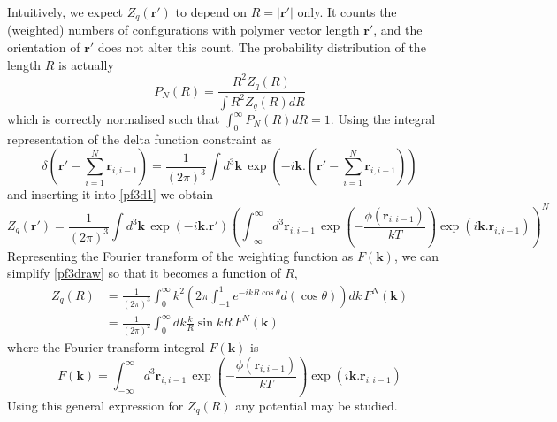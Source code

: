 Intuitively, we expect $Z_{q}\left(\boldsymbol{r}'\right)$ to depend on $R=|\boldsymbol{r}'|$ only. It counts the (weighted) numbers of configurations with polymer vector length $\boldsymbol{r}'$, and the orientation of $\boldsymbol{r}'$ does not alter this count. The probability distribution of the length $R$ is actually
%
\begin{equation}
P_{N}\left(R\right)= \frac{R^{2}Z_{q}\left(R\right)}{\int R^{2}Z_{q}\left(R\right)dR}
\end{equation}
%
which is correctly normalised such that $\int^{\infty}_{0} P_{N}\left(R\right)dR=1$. Using the integral representation of the delta function constraint as
%
\begin{equation}\label{pf3d_delta}
\delta\left(\boldsymbol{r}'-\sum_{i=1}^{N}\boldsymbol{r}_{i,i-1}\right)=\frac{1}{\left(2\pi\right)^{3}}\int d^{3}\boldsymbol{k}\, \exp\left(-i\boldsymbol{k}.\left(\boldsymbol{r}'-\sum_{i=1}^{N}\boldsymbol{r}_{i,i-1}\right)\right)
\end{equation}
%
and inserting it into \eqref{pf3d1} we obtain
%
\begin{equation}\label{pf3draw}
Z_{q}\left(\boldsymbol{r}'\right) = \frac{1}{\left(2\pi\right)^{3}}\int d^{3}\boldsymbol{k}\, \exp\left(-i\boldsymbol{k}.\boldsymbol{r}'\right)\left(\int_{-\infty}^{\infty}d^{3}\boldsymbol{r}_{i,i-1}\, \exp\left(-\frac{\phi\left(\boldsymbol{r}_{i,i-1}\right)}{kT}\right)\exp\left(i\boldsymbol{k}.\boldsymbol{r}_{i,i-1}\right) \right)^{N}
\end{equation}
%
Representing the Fourier transform of the weighting function as $F\left(\boldsymbol{k}\right)$, we can simplify \eqref{pf3draw} so that it becomes a function of $R$,
%
\begin{align}
Z_{q}\left(R\right) &= \frac{1}{\left(2\pi\right)^{3}}\int_{0}^{\infty}k^{2}\left(2\pi\int_{-1}^{1} e^{-ikR\cos \theta} d\left(\cos \theta \right)\right)dk\, F^{N}\left(\boldsymbol{k}\right) \\
&= \frac{1}{\left(2\pi\right)^{2}}\int_{0}^{\infty}dk\frac{k}{R}\sin kR\, F^{N}\left(\boldsymbol{k}\right)\label{PartitionFunctionUnsolved3D} 
\end{align}
%
where the Fourier transform integral $F\left(\boldsymbol{k}\right)$ is
%
\begin{equation}
F\left(\boldsymbol{k}\right)=\int_{-\infty}^{\infty}d^{3}\boldsymbol{r}_{i,i-1}\, \exp\left(-\frac{\phi\left(\boldsymbol{r}_{i,i-1}\right)}{kT}\right)\exp\left(i\boldsymbol{k}.\boldsymbol{r}_{i,i-1}\right)\label{FTPI_3D}
\end{equation}
%
Using this general expression for $Z_{q}\left(R\right)$ any potential may be studied.  


